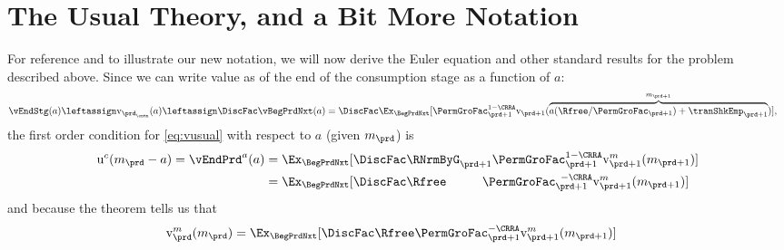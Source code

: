\documentclass[titlepage, headings=optiontotocandhead]{econtex}
\begin{document}


\hypertarget{the-usual-theory}{}
\section{The Usual Theory, and a Bit More Notation}\label{sec:the-usual-theory}


For reference and to illustrate our new notation, we will now derive the Euler equation and other standard results for the problem described above.
Since we can write value as of the end of the consumption stage as a function of $a$:
\begin{equation*}\begin{gathered}\begin{aligned}
  \vEndStg(a) & \leftassign \mathrm{v}_{\prd_\cntn}(a) \leftassign \DiscFac \vBegPrdNxt(a) = \DiscFac \Ex_{\BegPrdNxt}[\PermGroFac_{\prd+1}^{1-\CRRA}\mathrm{v}_{\prd+1}(\overbrace{a (\Rfree / \PermGroFac_{\prd+1})+\tranShkEmp_{\prd+1}}^{m_{\prd+1}})],
\end{aligned}\end{gathered}\end{equation*}
the first order condition for \eqref{eq:vusual} with respect to $a$ (given $m_{\prd}$) is
\begin{equation}\begin{gathered}\begin{aligned}
      \mathrm{u}^{c}(m_{\prd}-a) = \vEndPrd^{a}(a) & = \Ex_{\BegPrdNxt}[\DiscFac \RNrmByG_{\prd+1}\PermGroFac_{\prd+1}^{1-\CRRA}{\mathrm{v}}^m_{\prd+1}(m_{\prd+1})]  \label{eq:upceqEvtp1}
      \\                        & =  \Ex_{\BegPrdNxt}[\DiscFac\Rfree\phantom{._{\prd+1}}\PermGroFac_{\prd+1}^{\phantom{1}-\CRRA}{\mathrm{v}}^{m}_{\prd+1}(m_{\prd+1})]
    \end{aligned}\end{gathered}\end{equation}
and because the  theorem tells us that
\begin{equation}\begin{gathered}\begin{aligned}
      {\mathrm{v}}^{m}_{\prd}(m_{\prd})  & =  \Ex_{\BegPrdNxt} [\DiscFac \Rfree \PermGroFac_{\prd+1}^{-\CRRA}{\mathrm{v}}^{m}_{\prd+1}(m_{\prd+1})] \label{eq:envelope}
    \end{aligned}\end{gathered}\end{equation}
\end{document}
